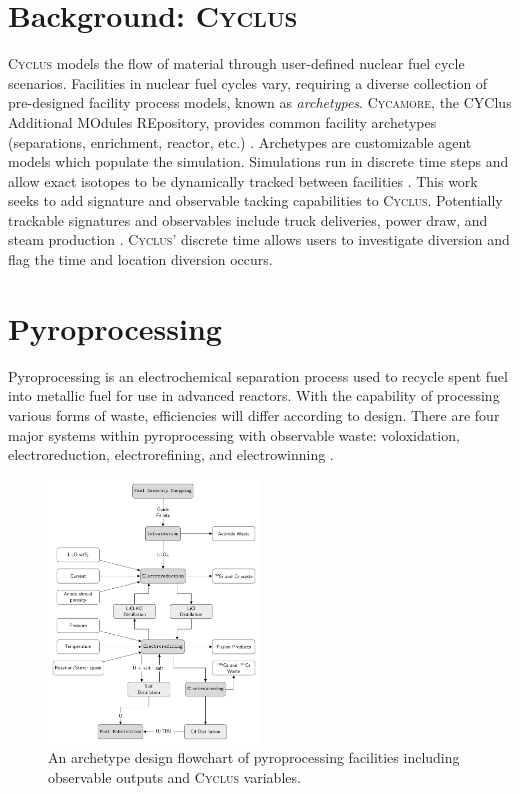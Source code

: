 \documentclass{anstrans}
\newcommand{\Cyclus}{\textsc{Cyclus}\xspace}%
\newcommand{\Cycamore}{\textsc{Cycamore}\xspace}%
\begin{document}
\section{Background: \Cyclus}
\Cyclus models the flow of material through user-defined nuclear fuel cycle scenarios. Facilities in nuclear fuel cycles vary, 
requiring a diverse collection of pre-designed facility process models, known as \emph{archetypes}. \Cycamore, the CYClus 
Additional MOdules REpository, provides common facility archetypes (separations, enrichment, reactor, etc.)
\cite{carlsen_cycamore_2014}. Archetypes are customizable agent models which populate the simulation. Simulations run in discrete time steps and allow exact isotopes to be dynamically tracked between facilities \cite{huff_fundamental_2016}. This work seeks to add signature and observable tacking capabilities to \Cyclus. Potentially trackable signatures and observables include truck deliveries, power draw, and steam production  \cite{Hou_2016,Yilmaz_2016}.
\Cyclus' discrete time allows users to investigate diversion and flag the time and location diversion occurs.

\section{Pyroprocessing}
Pyroprocessing is an electrochemical separation process used to recycle spent fuel into metallic fuel for use in advanced reactors.
With the capability of processing various forms of waste, efficiencies will differ according to design. There are four major 
systems within pyroprocessing with observable waste: voloxidation, electroreduction, electrorefining, and electrowinning \cite{Borrelli_2017}.  

\begin{figure}[ht] %
	\centering
	\includegraphics[width=0.5\textwidth]{flowchart}
	\caption{An archetype design flowchart of pyroprocessing facilities including observable outputs and \Cyclus variables.}
	\label{fig:flowchart}
\end{figure}
\end{document}

